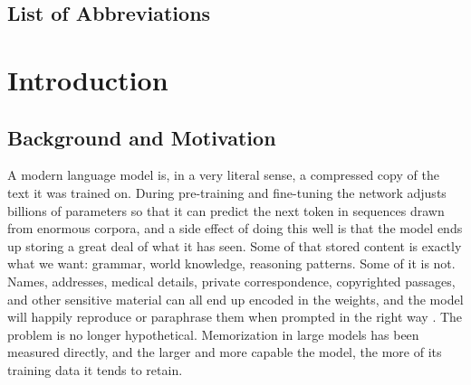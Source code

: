 \documentclass[a4paper,12pt]{report}
\begin{document}
\clearpage
\thispagestyle{plain}
\section*{List of Abbreviations}
\begin{acronym}[ROUGE-L]
\end{acronym}
\cleardoublepage

\chapter{Introduction}
\label{chap:introduction}

\section{Background and Motivation}
A modern language model is, in a very literal sense, a compressed copy of the text it was trained on. During pre-training and fine-tuning the network adjusts billions of parameters so that it can predict the next token in sequences drawn from enormous corpora, and a side effect of doing this well is that the model ends up storing a great deal of what it has seen. Some of that stored content is exactly what we want: grammar, world knowledge, reasoning patterns. Some of it is not. Names, addresses, medical details, private correspondence, copyrighted passages, and other sensitive material can all end up encoded in the weights, and the model will happily reproduce or paraphrase them when prompted in the right way \parencite{carlini2021extracting}. The problem is no longer hypothetical. Memorization in large models has been measured directly, and the larger and more capable the model, the more of its training data it tends to retain.
\end{document}

